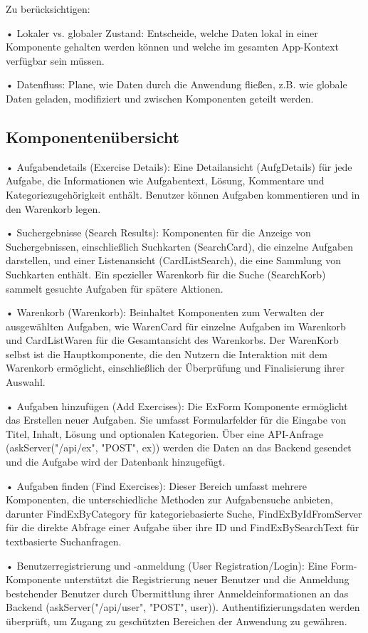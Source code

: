\documentclass[12pt,a4paper]{article} %
\begin{document}
Zu berücksichtigen:

•	Lokaler vs. globaler Zustand: Entscheide, welche Daten lokal in einer Komponente gehalten werden können und welche im gesamten App-Kontext verfügbar sein müssen.

•	Datenfluss: Plane, wie Daten durch die Anwendung fließen, z.B. wie globale Daten geladen, modifiziert und zwischen Komponenten geteilt werden.


\subsection{Komponentenübersicht}

•	Aufgabendetails (Exercise Details): Eine Detailansicht (AufgDetails) für jede Aufgabe, die Informationen wie Aufgabentext, Lösung, Kommentare und Kategoriezugehörigkeit enthält. Benutzer können Aufgaben kommentieren und in den Warenkorb legen.

•	Suchergebnisse (Search Results): Komponenten für die Anzeige von Suchergebnissen, einschließlich Suchkarten (SearchCard), die einzelne Aufgaben darstellen, und einer Listenansicht (CardListSearch), die eine Sammlung von Suchkarten enthält. Ein spezieller Warenkorb für die Suche (SearchKorb) sammelt gesuchte Aufgaben für spätere Aktionen.

•	Warenkorb (Warenkorb): Beinhaltet Komponenten zum Verwalten der ausgewählten Aufgaben, wie WarenCard für einzelne Aufgaben im Warenkorb und CardListWaren für die Gesamtansicht des Warenkorbs. Der WarenKorb selbst ist die Hauptkomponente, die den Nutzern die Interaktion mit dem Warenkorb ermöglicht, einschließlich der Überprüfung und Finalisierung ihrer Auswahl.

•	Aufgaben hinzufügen (Add Exercises): Die ExForm Komponente ermöglicht das Erstellen neuer Aufgaben. Sie umfasst Formularfelder für die Eingabe von Titel, Inhalt, Lösung und optionalen Kategorien. Über eine API-Anfrage (askServer("/api/ex", "POST", ex)) werden die Daten an das Backend gesendet und die Aufgabe wird der Datenbank hinzugefügt.

•	Aufgaben finden (Find Exercises): Dieser Bereich umfasst mehrere Komponenten, die unterschiedliche Methoden zur Aufgabensuche anbieten, darunter FindExByCategory für kategoriebasierte Suche, FindExByIdFromServer für die direkte Abfrage einer Aufgabe über ihre ID und FindExBySearchText für textbasierte Suchanfragen.

•	Benutzerregistrierung und -anmeldung (User Registration/Login): Eine Form-Komponente unterstützt die Registrierung neuer Benutzer und die Anmeldung bestehender Benutzer durch Übermittlung ihrer Anmeldeinformationen an das Backend (askServer("/api/user", "POST", user)).
    Authentifizierungsdaten werden überprüft, um Zugang zu geschützten Bereichen der Anwendung zu gewähren.
\end{document}
